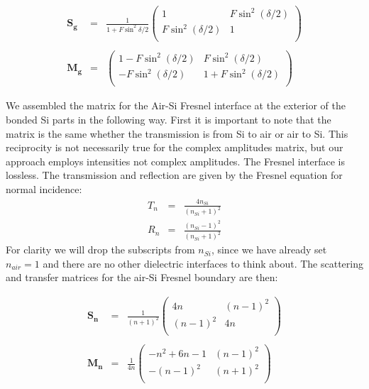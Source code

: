 \documentclass[osajnl,twocolumn,showpacs,superscriptaddress,11pt]{revtex4-1} %
\begin{document}
\begin{eqnarray}
\boldsymbol{S_g}&=&\frac{1}{1+F\sin^2{\delta/2}} \left(
\begin{array}{cc}
1 & F \sin ^2(\delta/2) \\
F \sin ^2(\delta/2) & 1 \\
\end{array}
\right) \nonumber \\
\nonumber \\
\boldsymbol{M_g}&=&\left(
\begin{array}{cc}
 1-F \sin ^2(\delta/2) & F \sin ^2(\delta/2) \\
 -F \sin ^2(\delta/2) & 1+F \sin ^2(\delta/2) \\
\end{array}
\right)
\label{eqn:EtalonMatrix}
\end{eqnarray}

We assembled the matrix for the Air-Si Fresnel interface at the exterior of the bonded Si parts in the following way.  First it is important to note that the matrix is the same whether the transmission is from Si to air or air to Si.  This reciprocity is not necessarily true for the complex amplitudes matrix, but our approach employs intensities not complex amplitudes.  The Fresnel interface is lossless.  The transmission and reflection are given by the Fresnel equation for normal incidence:
\begin{eqnarray}
T_n&=&\frac{4n_{Si}}{(n_{Si}+1)^2} \\
R_n&=&\frac{(n_{Si}-1)^2}{(n_{Si}+1)^2} \label{eq:FresnelTrans}
\end{eqnarray}
For clarity we will drop the subscripts from $n_{Si}$, since we have already set $n_{air}=1$ and there are no other dielectric interfaces to think about.  The scattering and transfer matrices for the air-Si Fresnel boundary are then:

\begin{eqnarray}
\boldsymbol{S_n}&=&\frac{1}{(n+1)^2} \left(
\begin{array}{cc}
4n & (n-1)^2 \\
(n-1)^2 & 4n \\
\end{array}
\right)  \nonumber \\
\nonumber \\
\boldsymbol{M_n}&=&\frac{1}{4n}\left(
\begin{array}{cc}
 -n^2+6  n-1 & ( n-1)^2 \\
 -( n-1)^2 & ( n+1)^2 \\
\end{array}
\right)
\label{eqn:SiAirMatrix}
\end{eqnarray}
\end{document}
